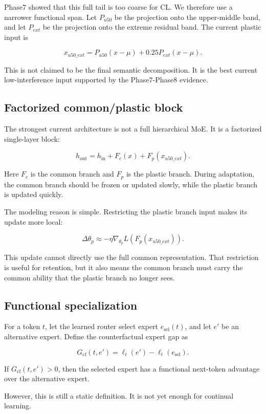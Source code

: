 \documentclass[11pt]{article}
\begin{document}
Phase7 showed that this full tail is too coarse for CL. We therefore use a narrower functional span. Let $P_{u50}$ be the projection onto the upper-middle band, and let $P_{ext}$ be the projection onto the extreme residual band. The current plastic input is

$$
x_{u50\_ext}=P_{u50}(x-\mu)+0.25P_{ext}(x-\mu).
$$

This is not claimed to be the final semantic decomposition. It is the best current low-interference input supported by the Phase7-Phase8 evidence.

\subsection{Factorized common/plastic block}

The strongest current architecture is not a full hierarchical MoE. It is a factorized single-layer block:

$$
h_{\mathrm{out}}
=
h_{\mathrm{in}}
+
F_c(x)
+
F_p(x_{u50\_ext}).
$$

Here $F_c$ is the common branch and $F_p$ is the plastic branch. During adaptation, the common branch should be frozen or updated slowly, while the plastic branch is updated quickly.

The modeling reason is simple. Restricting the plastic branch input makes its update more local:

$$
\Delta \theta_p
\approx
-\eta
\nabla_{\theta_p}
L(F_p(x_{u50\_ext})).
$$

This update cannot directly use the full common representation. That restriction is useful for retention, but it also means the common branch must carry the common ability that the plastic branch no longer sees.

\subsection{Functional specialization}

For a token $t$, let the learned router select expert $e_{\mathrm{sel}}(t)$, and let $e'$ be an alternative expert. Define the counterfactual expert gap as

$$
G_{\mathrm{cf}}(t,e')
=
\ell_t(e')-\ell_t(e_{\mathrm{sel}}).
$$

If $G_{\mathrm{cf}}(t,e')>0$, then the selected expert has a functional next-token advantage over the alternative expert.

However, this is still a static definition. It is not yet enough for continual learning.
\end{document}
